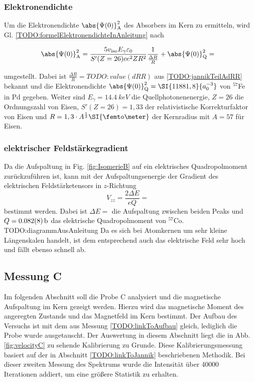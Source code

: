\subsubsection{Elektronendichte}

Um die Elektronendichte $\abs{\Psi(0)}^2_\text{A}$ des Absorbers im Kern zu ermitteln, wird Gl. \ref{TODO:formelElektronendichteInAnleitung} nach

\begin{equation}
\abs{\Psi(0)}^2_\text{A} = \frac{5 v_\text{iso} E_\gamma \varepsilon_0}{S'(Z = 26) c e^2 Z R^2} \frac{1}{\frac{\Delta R}{R}} + \abs{\Psi(0)}^2_\text{Q} = 
\end{equation}

\noindent umgestellt.
Dabei ist $\frac{\Delta R}{R} = TODO:value(dRR)$ aus \ref{TODO:jannikTeilAdRR} bekannt und die Elektronendichte $\abs{\Psi(0)}^2_\text{Q} = \SI{11881,8}{a_0^{-3}}$ von $^57$Fe in Pd gegeben.
Weiter sind $E_\gamma = \SI{14,4}{keV}$ die Quellphotonenenergie, $Z=26$ die Ordnungszahl von Eisen,
    $S'(Z = 26) = 1,33$ der relativistische Korrekturfaktor von Eisen und $R = 1,3 \cdot A^\frac{1}{3} \SI{\femto\meter}$ der Kernradius mit $A=57$ für Eisen.

\subsubsection{elektrischer Feldstärkegradient}

Da die Aufspaltung  in Fig. \ref{fig:IsomerieB} auf ein elektrisches Quadropolmoment zurückzuführen ist,
	kann mit der Aufspaltungsenergie der Gradient des elektrischen Feldstärketensors in $z$-Richtung
\begin{equation}
	V_{zz} = \frac{2 \Delta E}{e Q} = 
\end{equation}
bestimmt werden.
Dabei ist $\Delta E = $ die Aufspaltung zwischen beiden Peaks und $Q = \SI{0,082 \pm 0,008}{b}$ das elektrische Quadropolmoment von $^{57}$Co. TODO:diagrammAusAnleitung
Da es sich bei Atomkernen um sehr kleine Längenskalen handelt, ist dem entsprechend auch das elektrische Feld sehr hoch und fällt ebenso schnell ab.

\subsection{Messung C}

Im folgenden Abschnitt soll die Probe C analysiert und die magnetische Aufspaltung im Kern gezeigt werden.
Hierzu wird das magnetische Moment des angeregten Zustands und das Magnetfeld im Kern bestimmt.
Der Aufbau des Versuchs ist mit dem aus Messung \ref{TODO:linkToAufbau} gleich, lediglich die Probe wurde ausgetauscht.
Der Auswertung in diesem Abschnitt liegt die in Abb. \ref{fig:velocityC} zu sehende Kalibrierung zu Grunde.
Diese Kalibrierungsmessung basiert auf der in Abschnitt \ref{TODO:linkToJannik} beschriebenen Methodik.
Bei dieser zweiten Messung des Spektrums wurde die Intensität über 40000 Iterationen addiert, um eine größere Statistik zu erhalten.

